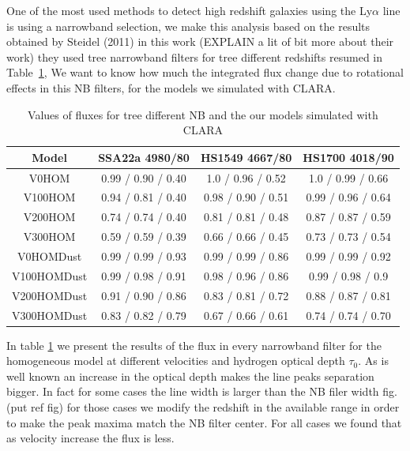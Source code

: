 \documentclass[usenatbib]{mn2e}
\begin{document}
One of the most used methods to detect high redshift galaxies using the Ly$\alpha$ line is using a narrowband selection, we make this analysis based on the results obtained by Steidel (2011) in this work (EXPLAIN a lit of bit more about their work) they used tree narrowband filters for tree different redshifts resumed in Table~\ref{table:NBfilters}, We want to know how much the integrated flux change due to rotational effects in this NB filters, for the models we simulated with CLARA.

\begin{table}
\begin{center}
\begin{tabular}{cccc}\hline
Model & SSA22a 4980/80   & HS1549 4667/80 & HS1700 4018/90\\
\hline
V0HOM & 0.99 / 0.90 / 0.40 & 1.0 / 0.96 / 0.52 & 1.0 / 0.99 / 0.66 \\
V100HOM & 0.94 / 0.81 / 0.40 & 0.98 / 0.90 / 0.51 & 0.99 / 0.96 / 0.64 \\
V200HOM & 0.74 / 0.74 / 0.40 & 0.81 / 0.81 / 0.48 & 0.87 / 0.87 / 0.59 \\
V300HOM & 0.59 / 0.59 / 0.39 & 0.66 / 0.66 / 0.45 & 0.73 / 0.73 / 0.54 \\
V0HOMDust & 0.99 / 0.99 / 0.93 & 0.99 / 0.99 / 0.86 & 0.99 / 0.99 / 0.92\\
V100HOMDust & 0.99 / 0.98 / 0.91 & 0.98 / 0.96 / 0.86 & 0.99 / 0.98 / 0.9\\
V200HOMDust & 0.91 / 0.90 / 0.86 & 0.83 / 0.81 / 0.72 & 0.88 / 0.87 / 0.81\\
V300HOMDust & 0.83 / 0.82 / 0.79 & 0.67 / 0.66 / 0.61 & 0.74 / 0.74 / 0.70\\
\hline
\end{tabular}
\caption{
Values of fluxes for tree different NB and the our models simulated with CLARA
} 
\label{table:NBfilters}
\end{center}
\end{table}

In table \ref{table:NBfilters} we present the results of the flux in every 
narrowband filter for the homogeneous model at different velocities and hydrogen 
optical depth $\tau_{0}$. As is well known an increase in the optical depth makes 
the line peaks separation bigger. In fact for some cases the line width is larger 
than the NB filer width fig.(put ref fig) for those cases we modify the redshift 
in the available range in order to make the peak maxima match the NB filter center. 
For all cases we found that as velocity increase the flux is less. 
\end{document}
